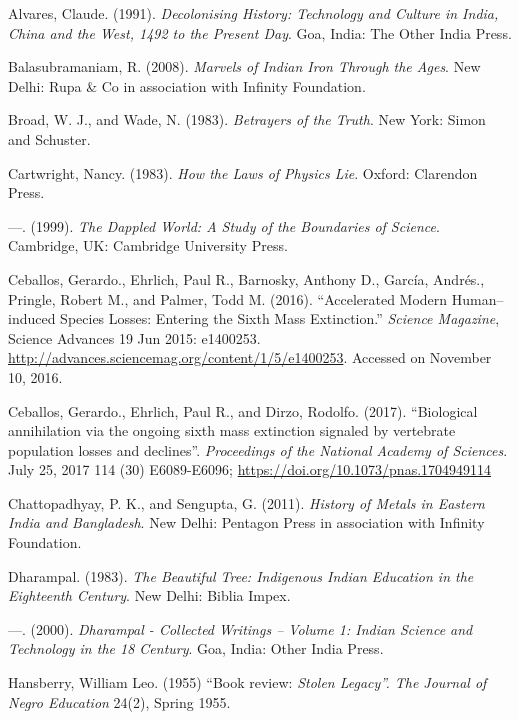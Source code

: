 \begin{thebibliography}{99}
 Alvares, Claude. (1991). \textit{Decolonising History: Technology and Culture in India, China and the West, 1492 to the Present Day}. Goa, India: The Other India Press.

  Balasubramaniam, R. (2008). \textit{Marvels of Indian Iron Through the Ages}. New Delhi: Rupa \& Co in association with Infinity Foundation.

  Broad, W. J., and Wade, N. (1983). \textit{Betrayers of the Truth}. New York: Simon and Schuster.

  Cartwright, Nancy. (1983). \textit{How the Laws of Physics Lie}. Oxford: Clarendon Press.

  —. (1999). \textit{The Dappled World: A Study of the Boundaries of Science}. Cambridge, UK: Cambridge University Press.

  Ceballos, Gerardo., Ehrlich, Paul R., Barnosky, Anthony D., García, Andrés., Pringle, Robert M., and Palmer, Todd M. (2016). “Accelerated Modern Human–induced Species Losses: Entering the Sixth Mass Extinction.” \textit{Science Magazine}, Science Advances 19 Jun 2015: e1400253. \url{http://advances.sciencemag.org/content/1/5/e1400253}. Accessed on November 10, 2016.

  Ceballos, Gerardo., Ehrlich, Paul R., and Dirzo, Rodolfo. (2017). “Biological annihilation via the ongoing sixth mass extinction signaled by vertebrate population losses and declines”. \textit{Proceedings of the National Academy of Sciences}. July 25, 2017 114 (30) E6089-E6096; \url{https://doi.org/10.1073/pnas.1704949114}

  Chattopadhyay, P. K., and Sengupta, G. (2011). \textit{History of Metals in Eastern India and Bangladesh}. New Delhi: Pentagon Press in association with Infinity Foundation.

  Dharampal. (1983). \textit{The Beautiful Tree: Indigenous Indian Education in the Eighteenth Century}. New Delhi: Biblia Impex.

  —. (2000). \textit{Dharampal - Collected Writings – Volume 1: Indian Science and Technology in the 18 Century}. Goa, India: Other India Press.

  Hansberry, William Leo. (1955) “Book review: \textit{Stolen Legacy”. The Journal of Negro Education} 24(2), Spring 1955.


\end{thebibliography}
